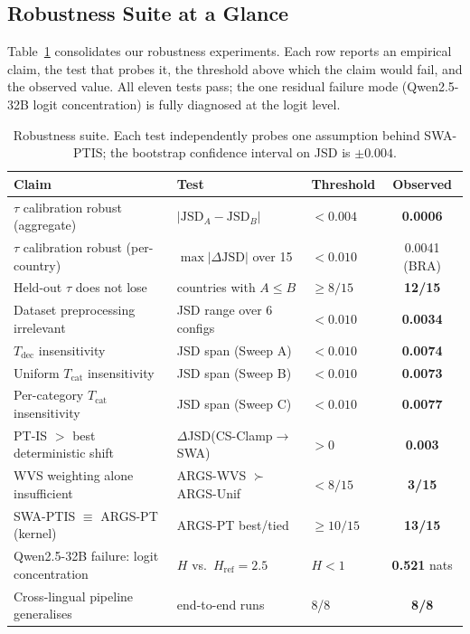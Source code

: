 \documentclass{article}
\begin{document}
\subsection{Robustness Suite at a Glance}
\label{sec:robustness}

Table~\ref{tab:robustness_summary} consolidates our robustness experiments.
Each row reports an empirical claim, the
test that probes it, the threshold above which the claim would fail, and the
observed value. All eleven tests pass; the one residual failure mode
(Qwen2.5-32B logit concentration) is fully diagnosed at the logit level.

\begin{table}[h]\centering\small
\caption{Robustness suite. Each test independently probes one assumption
behind SWA-PTIS; the bootstrap confidence interval on JSD is $\pm 0.004$.}
\label{tab:robustness_summary}
\setlength{\tabcolsep}{4pt}
\begin{tabular}{lllc}\toprule
Claim & Test & Threshold & Observed \\\midrule
$\tau$ calibration robust (aggregate) & $|\text{JSD}_A{-}\text{JSD}_B|$ & $<\!0.004$ & \textbf{0.0006} \\
$\tau$ calibration robust (per-country) & $\max|\Delta\text{JSD}|$ over 15 & $<\!0.010$ & 0.0041 (BRA) \\
Held-out $\tau$ does not lose & countries with $A{\le}B$ & $\ge 8/15$ & \textbf{12/15} \\
Dataset preprocessing irrelevant & JSD range over 6 configs & $<\!0.010$ & \textbf{0.0034} \\
$T_\text{dec}$ insensitivity & JSD span (Sweep A) & $<\!0.010$ & \textbf{0.0074} \\
Uniform $T_\text{cat}$ insensitivity & JSD span (Sweep B) & $<\!0.010$ & \textbf{0.0073} \\
Per-category $T_\text{cat}$ insensitivity & JSD span (Sweep C) & $<\!0.010$ & \textbf{0.0077} \\
PT-IS $>$ best deterministic shift & $\Delta$JSD(CS-Clamp$\to$SWA) & $>\!0$ & \textbf{0.003} \\
WVS weighting alone insufficient & ARGS-WVS $\succ$ ARGS-Unif & $<\!8/15$ & \textbf{3/15} \\
SWA-PTIS $\equiv$ ARGS-PT (kernel) & ARGS-PT best/tied & $\ge 10/15$ & \textbf{13/15} \\
Qwen2.5-32B failure: logit concentration & $H$ vs.\ $H_\text{ref}{=}2.5$ & $H{<}1$ & \textbf{0.521} nats \\
Cross-lingual pipeline generalises & end-to-end runs & 8/8 & \textbf{8/8} \\\bottomrule
\end{tabular}
\end{table}
\end{document}
